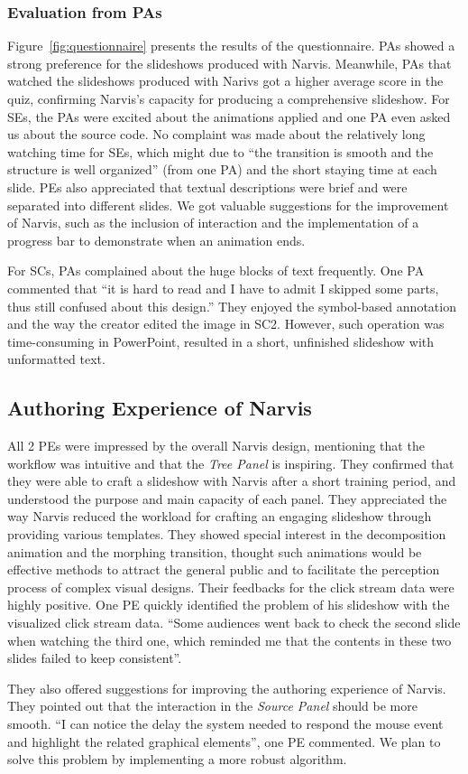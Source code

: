 \subsubsection{Evaluation from PAs}

Figure~\ref{fig:questionnaire} presents the results of the questionnaire. PAs showed a strong preference for the slideshows produced with Narvis. Meanwhile,  PAs that watched the slideshows produced with Narivs got a higher average score in the quiz, confirming Narvis's capacity for producing a comprehensive slideshow. 
For SEs, the PAs were excited about the animations applied and one PA even asked us about the source code. No complaint was made about the relatively long watching time for SEs, which might due to ``the transition is smooth and the structure is well organized'' (from one PA) and the short staying time at each slide. PEs also appreciated that textual descriptions were brief and were separated into different slides.
We got valuable suggestions for the improvement of Narvis, such as the inclusion of interaction and the implementation of a progress bar to demonstrate when an animation ends. 

For SCs, PAs complained about the huge blocks of text frequently. 
One PA commented that ``it is hard to read and I have to admit I skipped some parts, thus still confused about this design.'' They enjoyed the symbol-based annotation and the way the creator edited the image in SC2. However, such operation was time-consuming in PowerPoint, resulted in a short, unfinished slideshow with unformatted text. 


\subsection{Authoring Experience of Narvis}
All 2 PEs were impressed by the overall Narvis design, mentioning that the workflow was intuitive and that the \textit{Tree Panel} is inspiring. They confirmed that they were able to craft a slideshow with Narvis after a short training period, and understood the purpose and main capacity of each panel. 
They appreciated the way Narvis reduced the workload for crafting an engaging slideshow through providing various templates. They showed special interest in the decomposition animation and the morphing transition, thought such animations would be effective methods to attract the general public and to facilitate the perception process of complex visual designs.  
Their feedbacks for the  click stream data were highly positive. One PE quickly identified the problem of his slideshow with the visualized click stream data. ``Some audiences went back to check the second slide when watching the third one, which reminded me that the contents in these two slides failed to keep consistent''.

They also offered suggestions for improving the authoring experience of Narvis. They pointed out that the interaction in the \textit{Source Panel} should be more smooth. ``I can notice the delay the system needed to respond the mouse event and highlight the related graphical elements'', one PE commented. We plan to solve this problem by implementing a more robust algorithm. 

